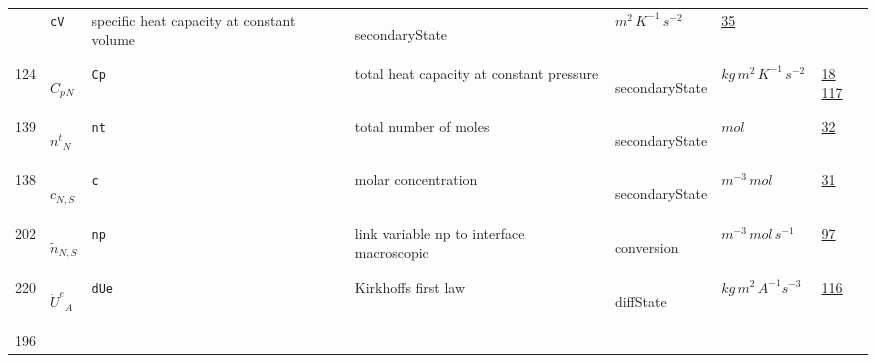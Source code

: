 \begin{longtable}{|p{1cm}|p{2.5cm}|p{4.5cm}|p{8cm}|p{3.0cm}|p{3cm}|p{1cm}|}
             & \verb|cV|
             & specific heat capacity at constant volume
             & \begin{lay}secondaryState \end{lay}
             & $ m^{2} \,K^{-1} \,s^{-2} \, $
             &                 \hyperlink{"e:35"}{ 35 }
                 \\
            124
             & \hypertarget{"v:124"}{ $ {{C_p}}{_{N}} $}
             & \verb|Cp|
             & total heat capacity at constant pressure
             & \begin{lay}secondaryState \end{lay}
             & $ kg \,m^{2} \,K^{-1} \,s^{-2} \, $
             &                 \hyperlink{"e:18"}{ 18 }
                                 \hyperlink{"e:117"}{ 117 }
                 \\
            139
             & \hypertarget{"v:139"}{ $ {{n^t}}{_{N}} $}
             & \verb|nt|
             & total number of moles
             & \begin{lay}secondaryState \end{lay}
             & $ mol \, $
             &                 \hyperlink{"e:32"}{ 32 }
                 \\
            138
             & \hypertarget{"v:138"}{ $ {c}{_{N, S}} $}
             & \verb|c|
             & molar concentration
             & \begin{lay}secondaryState \end{lay}
             & $ m^{-3} \,mol \, $
             &                 \hyperlink{"e:31"}{ 31 }
                 \\
            202
             & \hypertarget{"v:202"}{ $ {{\tilde{n}}}{_{N, S}} $}
             & \verb|np|
             & link variable  np to interface macroscopic
             & \begin{lay}conversion \end{lay}
             & $ m^{-3} \,mol \,s^{-1} \, $
             &                 \hyperlink{"e:97"}{ 97 }
                 \\
            220
             & \hypertarget{"v:220"}{ $ {{\dot{U}^e}}{_{A}} $}
             & \verb|dUe|
             & Kirkhoffs first law
             & \begin{lay}diffState \end{lay}
             & $ kg \,m^{2} \,A^{-1} s^{-3} \, $
             &                 \hyperlink{"e:116"}{ 116 }
                 \\
            196

\end{longtable}
